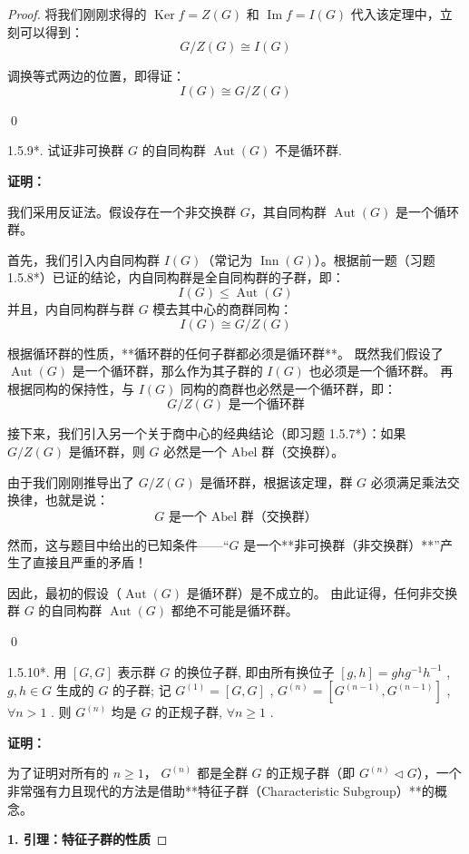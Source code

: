 \documentclass[]{article}
\begin{document}
\begin{proof}
将我们刚刚求得的 $\operatorname{Ker} f = Z(G)$ 和 $\operatorname{Im} f = I(G)$ 代入该定理中，立刻可以得到：
\[ G / Z(G) \cong I(G) \]

调换等式两边的位置，即得证：
\[ I(G) \cong G / Z(G) \]

\qed

1.5.9*. 试证非可换群 $G$ 的自同构群 $\operatorname{Aut}(G)$ 不是循环群. 

\bigskip
\noindent \textbf{证明：} 

我们采用反证法。假设存在一个非交换群 $G$，其自同构群 $\operatorname{Aut}(G)$ 是一个循环群。

\bigskip
首先，我们引入内自同构群 $I(G)$（常记为 $\operatorname{Inn}(G)$）。根据前一题（习题 1.5.8*）已证的结论，内自同构群是全自同构群的子群，即：
\[ I(G) \leqslant \operatorname{Aut}(G) \]
并且，内自同构群与群 $G$ 模去其中心的商群同构：
\[ I(G) \cong G / Z(G) \]

根据循环群的性质，**循环群的任何子群都必须是循环群**。
既然我们假设了 $\operatorname{Aut}(G)$ 是一个循环群，那么作为其子群的 $I(G)$ 也必须是一个循环群。
再根据同构的保持性，与 $I(G)$ 同构的商群也必然是一个循环群，即：
\[ G / Z(G) \text{ 是一个循环群} \]

\bigskip
接下来，我们引入另一个关于商中心的经典结论（即习题 1.5.7*）：如果 $G / Z(G)$ 是循环群，则 $G$ 必然是一个 Abel 群（交换群）。

由于我们刚刚推导出了 $G / Z(G)$ 是循环群，根据该定理，群 $G$ 必须满足乘法交换律，也就是说：
\[ G \text{ 是一个 Abel 群（交换群）} \]

\bigskip
然而，这与题目中给出的已知条件——“$G$ 是一个**非可换群（非交换群）**”产生了直接且严重的矛盾！

因此，最初的假设（$\operatorname{Aut}(G)$ 是循环群）是不成立的。
由此证得，任何非交换群 $G$ 的自同构群 $\operatorname{Aut}(G)$ 都绝不可能是循环群。

\qed

1.5.10*. 用 $[G, G]$ 表示群 $G$ 的换位子群, 即由所有换位子 $[g, h] = ghg^{-1}h^{-1}$ , $g, h \in G$ 生成的 $G$ 的子群; 记 $G^{(1)} = [G, G]$ , $G^{(n)} = [G^{(n-1)}, G^{(n-1)}]$ , $\forall n > 1$ . 则 $G^{(n)}$ 均是 $G$ 的正规子群, $\forall n \geqslant 1$ . 

\bigskip
\noindent \textbf{证明：} 

为了证明对所有的 $n \ge 1$， $G^{(n)}$ 都是全群 $G$ 的正规子群（即 $G^{(n)} \triangleleft G$），一个非常强有力且现代的方法是借助**特征子群（Characteristic Subgroup）**的概念。

\bigskip
\noindent \textbf{1. 引理：特征子群的性质}


\end{proof}
\end{document}
